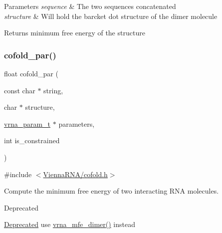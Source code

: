 \begin{DoxyParams}{Parameters}
{\em sequence} & The two sequences concatenated \\
\hline
{\em structure} & Will hold the barcket dot structure of the dimer molecule \\
\hline
\end{DoxyParams}
\begin{DoxyReturn}{Returns}
minimum free energy of the structure 
\end{DoxyReturn}
\mbox{\label{group__mfe__cofold_ga7612cfeeb1b793f1e4179b1eb53df1f3}} 
\subsubsection{\texorpdfstring{cofold\+\_\+par()}{cofold\_par()}}
{\footnotesize\ttfamily float cofold\+\_\+par (\begin{DoxyParamCaption}\item[{const char $\ast$}]{string,  }\item[{char $\ast$}]{structure,  }\item[{\hyperlink{group__energy__parameters_ga8a69ca7d787e4fd6079914f5343a1f35}{vrna\+\_\+param\+\_\+t} $\ast$}]{parameters,  }\item[{int}]{is\+\_\+constrained }\end{DoxyParamCaption})}



{\ttfamily \#include $<$\hyperlink{cofold_8h}{Vienna\+R\+N\+A/cofold.\+h}$>$}



Compute the minimum free energy of two interacting R\+NA molecules. 

\begin{DoxyRefDesc}{Deprecated}
\item[\hyperlink{deprecated__deprecated000031}{Deprecated}]use \hyperlink{group__mfe__cofold_gaab22d10c1190f205f16a77cab9d5d3ee}{vrna\+\_\+mfe\+\_\+dimer()} instead\end{DoxyRefDesc}
\mbox{\label{group__mfe__cofold_gaafb33d7473eb9af9d1b168ca8761c41a}} 
